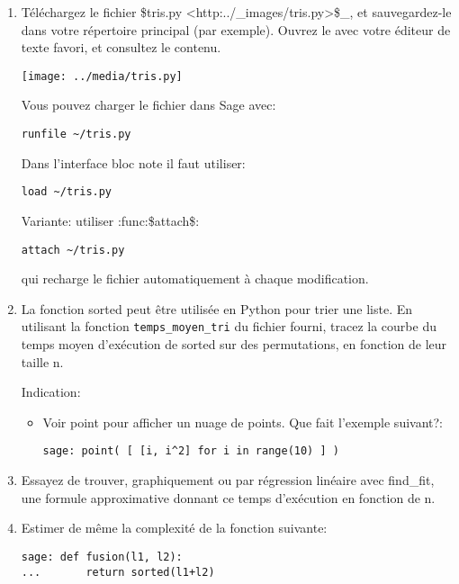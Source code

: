 \begin{enumerate}
\item
  Téléchargez le fichier \$tris.py
  \textless{}http:../\_images/tris.py\textgreater{}\$\_, et
  sauvegardez-le dans votre répertoire principal (par exemple). Ouvrez
  le avec votre éditeur de texte favori, et consultez le contenu.

  \texttt{[image: ../media/tris.py]}

  Vous pouvez charger le fichier dans Sage avec:

\begin{verbatim}
runfile ~/tris.py
\end{verbatim}

  Dans l'interface bloc note il faut utiliser:

\begin{verbatim}
load ~/tris.py
\end{verbatim}

  Variante: utiliser :func:\$attach\$:

\begin{verbatim}
attach ~/tris.py
\end{verbatim}

  qui recharge le fichier automatiquement à chaque modification.
\item
  La fonction sorted peut être utilisée en Python pour trier une liste.
  En utilisant la fonction \texttt{temps\_moyen\_tri} du fichier fourni,
  tracez la courbe du temps moyen d'exécution de sorted sur des
  permutations, en fonction de leur taille n.

  Indication:

  \begin{itemize}
  \item
    Voir point pour afficher un nuage de points. Que fait l'exemple
    suivant?:

\begin{verbatim}
sage: point( [ [i, i^2] for i in range(10) ] )
\end{verbatim}
  \end{itemize}
\item
  Essayez de trouver, graphiquement ou par régression linéaire avec
  find\_fit, une formule approximative donnant ce temps d'exécution en
  fonction de n.
\item
  Estimer de même la complexité de la fonction suivante:

\begin{verbatim}
sage: def fusion(l1, l2):
...       return sorted(l1+l2)
\end{verbatim}
\end{enumerate}

